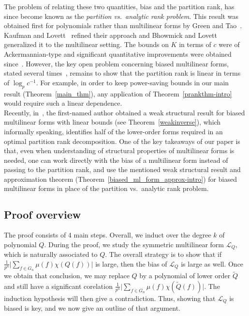 \documentclass[a4paper,11pt]{article}
\theoremstyle{definition}
\begin{document}
The problem of relating these two quantities, bias and the partition rank, has since become known as the \textit{partition vs.\ analytic rank problem}. This result was obtained first for polynomials rather than multilinear forms by Green and Tao~\cite{GreenTaoPolys}. Kaufman and Lovett~\cite{KaufmanLovett} refined their approach and Bhowmick and Lovett~\cite{BhowLov} generalized it to the multilinear setting. The bounds on $K$ in terms of $c$ were of Ackermannian-type and significant quantitative improvements were obtained since~\cite{Janzer2, LukaPrank, MoshZhuRank}. However, the key open problem concerning biased multilinear forms, stated several times~\cite{AdipKazhZie, KazhZie, LamZie, Lovett}, remains to show that the partition rank is linear in terms of $\log_p c^{-1}$. For example, in order to keep power-saving bounds in our main result (Theorem~\ref{main_thm}), any application of Theorem~\ref{prankthm-intro} would require such a linear dependence.\\

Recently, in~\cite{LukaOptimalWeak}, the first-named author obtained a weak structural result for biased multilinear forms with linear bounds (see Theorem~\ref{weakinverse}), which informally speaking, identifies half of the lower-order forms required in an optimal partition rank decomposition. One of the key takeaways of our paper is that, even when understanding of structural properties of multilinear forms is needed, one can work directly with the bias of a multilinear form instead of passing to the partition rank, and use the mentioned weak structural result and approximation theorem (Theorem~\ref{biased_ml_form_approx-intro}) for biased multilinear forms in place of the partition vs.\ analytic rank problem.\\

\subsection{Proof overview}

The proof consists of 4 main steps. Overall, we induct over the degree $k$ of polynomial $Q$. During the proof, we study the symmetric multilinear form $\mathcal{L}_Q$, which is naturally associated to $Q$. The overall strategy is to show that if $\frac{1}{p^n}\Big|\sum_{f \in G_n} \mu(f)\chi(Q(f))\Big|$ is large, then the bias of $\mathcal{L}_Q$ is large as well. Once we obtain that conclusion, we may replace $Q$ by a polynomial of lower order $\tilde{Q}$ and still have a significant corelation $\frac{1}{p^n}\Big|\sum_{f \in G_n} \mu(f)\chi(\tilde{Q}(f))\Big|$. The induction hypothesis will then give a contradiction. Thus, showing that  $\mathcal{L}_Q$ is biased is key, and we now give an outline of that argument.
\end{document}
